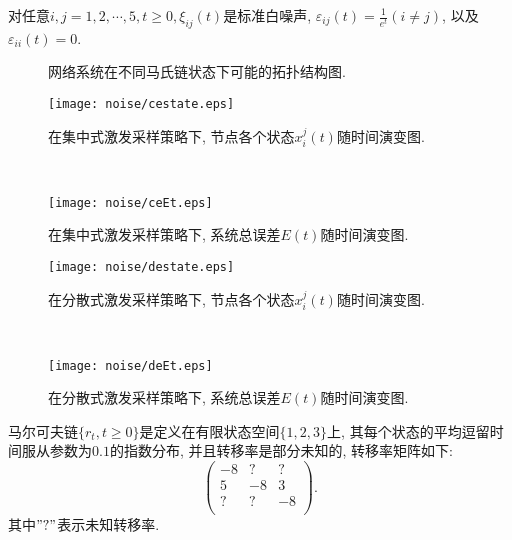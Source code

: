     对任意$i,j=1,2,\cdots,5, t\geq0, \xi_{ij}(t)$是标准白噪声, $\varepsilon_{ij}(t)=\frac{1}{e^t}(i\neq j)$, 以及$\varepsilon_{ii}(t)=0$.
    \begin{figure}
     \begin{center}
     \end{center}
  \caption{网络系统在不同马氏链状态下可能的拓扑结构图.}\label{tuopu}
  \end{figure}
\begin{figure}[!htb]
\begin{minipage}[t]{0.48\linewidth}\centering
\texttt{[image: noise/cestate.eps]}\caption{在集中式激发采样策略下, 节点各个状态$x_i^j(t)$随时间演变图.}\label{cefig}
\end{minipage}~~
\begin{minipage}[t]{0.48\linewidth}\centering
\texttt{[image: noise/ceEt.eps]}\caption{在集中式激发采样策略下, 系统总误差$E(t)$随时间演变图.}\label{ceEt}
\end{minipage}
\end{figure}
\begin{figure}[!htb]
\begin{minipage}[t]{0.48\linewidth}\centering
\texttt{[image: noise/destate.eps]}\caption{在分散式激发采样策略下, 节点各个状态$x_i^j(t)$随时间演变图.}\label{defig}
\end{minipage}~~
\begin{minipage}[t]{0.48\linewidth}\centering
\texttt{[image: noise/deEt.eps]}\caption{在分散式激发采样策略下, 系统总误差$E(t)$随时间演变图.}\label{deEt}
\end{minipage}
\end{figure}
马尔可夫链$\{r_t, t\geq0\}$是定义在有限状态空间$\{1,2,3\}$上, 其每个状态的平均逗留时间服从参数为$0.1$的指数分布, 并且转移率是部分未知的, 转移率矩阵如下:
        $$
          \left(
            \begin{array}{ccc}
              -8 & ? & ? \\
              5 & -8 & 3 \\
              ? & ? & -8 \\
            \end{array}
          \right).
          $$
    其中$"?"$表示未知转移率.


